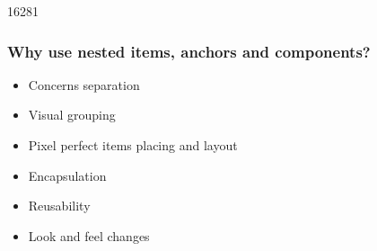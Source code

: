 \begin{slide}{16281}
\frametitle{Why use nested items, anchors and components?}

\begin{itemize}
\item Concerns separation
\item Visual grouping
\item Pixel perfect items placing and layout
\item Encapsulation
\item Reusability
\item Look and feel changes
\end{itemize}


\end{slide}






